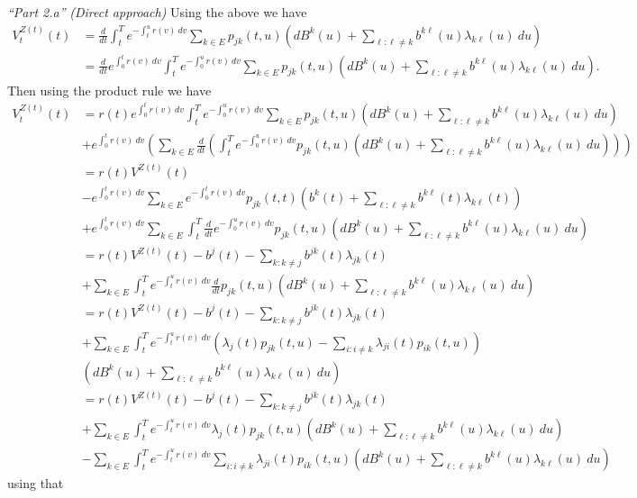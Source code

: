 \documentclass[a4paper,12pt,openany]{book}
\begin{document}
\emph{``Part 2.a''} \emph{(Direct approach)} Using the above we have
\begin{align*}
V_t^{Z(t)}(t)&=\frac{d}{dt}\int_t^Te^{-\int_t^ur(v)\ dv}\sum_{k\in E}p_{jk}(t,u)\left(d B^k(u)+\sum_{\ell :\ell \ne k}  b^{k\ell }(u)\lambda_{k\ell }(u)\ du\right)\\
&=\frac{d}{dt}e^{\int_0^tr(v)\ dv}\int_t^Te^{-\int_0^ur(v)\ dv}\sum_{k\in E}p_{jk}(t,u)\left(d B^k(u)+\sum_{\ell :\ell \ne k}  b^{k\ell }(u)\lambda_{k\ell }(u)\ du\right).
\end{align*}
Then using the product rule we have
\begin{align*}
V_t^{Z(t)}(t)&=r(t)e^{\int_0^tr(v)\ dv}\int_t^Te^{-\int_0^ur(v)\ dv}\sum_{k\in E}p_{jk}(t,u)\left(d B^k(u)+\sum_{\ell :\ell \ne k}  b^{k\ell }(u)\lambda_{k\ell }(u)\ du\right)\\
&+e^{\int_0^tr(v)\ dv}\left(\sum_{k\in E}\frac{d}{dt}\left(\int_t^Te^{-\int_0^ur(v)\ dv}p_{jk}(t,u)\left(d B^k(u)+\sum_{\ell :\ell \ne k}  b^{k\ell }(u)\lambda_{k\ell }(u)\ du\right)\right)\right)\\
&=r(t)V^{Z(t)}(t)\\
&-e^{\int_0^tr(v)\ dv}\sum_{k\in E}e^{-\int_0^tr(v)\ dv}p_{jk}(t,t)\left(b^k(t)+\sum_{\ell :\ell \ne k}  b^{k\ell }(t)\lambda_{k\ell }(t)\right)\\
&+e^{\int_0^tr(v)\ dv}\sum_{k\in E}\int_t^T\frac{d}{dt}e^{-\int_0^ur(v)\ dv}p_{jk}(t,u)\left(d B^k(u)+\sum_{\ell :\ell \ne k}  b^{k\ell }(u)\lambda_{k\ell }(u)\ du\right)\\
&=r(t)V^{Z(t)}(t)-b^j(t)-\sum_{k :k \ne j}  b^{jk}(t)\lambda_{jk }(t)\\
&+\sum_{k\in E}\int_t^Te^{-\int_t^ur(v)\ dv}\frac{d}{dt}p_{jk}(t,u)\left(d B^k(u)+\sum_{\ell :\ell \ne k}  b^{k\ell }(u)\lambda_{k\ell }(u)\ du\right)\\
&=r(t)V^{Z(t)}(t)-b^j(t)-\sum_{k :k \ne j}  b^{jk}(t)\lambda_{jk }(t)\\
&+\sum_{k\in E}\int_t^Te^{-\int_t^ur(v)\ dv}\left(\lambda_j(t)p_{jk}(t,u)-\sum_{i:i\ne k}\lambda_{ji}(t)p_{ik}(t,u)\right)\\
&\left(d B^k(u)+\sum_{\ell :\ell \ne k}  b^{k\ell }(u)\lambda_{k\ell }(u)\ du\right)\\
&=r(t)V^{Z(t)}(t)-b^j(t)-\sum_{k :k \ne j}  b^{jk}(t)\lambda_{jk }(t)\\
&+\sum_{k\in E}\int_t^Te^{-\int_t^ur(v)\ dv}\lambda_j(t)p_{jk}(t,u)\left(d B^k(u)+\sum_{\ell :\ell \ne k}  b^{k\ell }(u)\lambda_{k\ell }(u)\ du\right)\\
&-\sum_{k\in E}\int_t^Te^{-\int_t^ur(v)\ dv}\sum_{i:i\ne k}\lambda_{ji}(t)p_{ik}(t,u)\left(d B^k(u)+\sum_{\ell :\ell \ne k}  b^{k\ell }(u)\lambda_{k\ell }(u)\ du\right)
\end{align*}
using that
\end{document}

